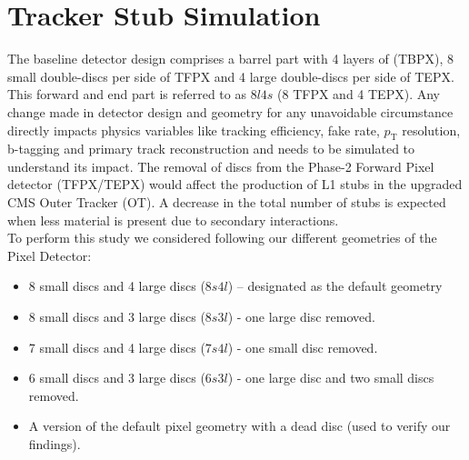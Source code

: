 \section{Tracker Stub Simulation}

The baseline detector design comprises a barrel part with 4 layers of  (TBPX), 8 small double-discs per side of TFPX and 4 large double-discs per side of TEPX. This forward and end part is referred to as $8l4s$ (8 TFPX and 4 TEPX). Any change made in detector design and geometry for any unavoidable circumstance directly impacts physics variables like tracking efficiency, fake rate, $p_\text{T}$ resolution, b-tagging and primary track reconstruction and needs to be simulated to understand its impact. The removal of discs from the Phase-2 Forward Pixel detector (TFPX/TEPX) would affect the production of L1 stubs in the upgraded CMS Outer Tracker (OT). A decrease in the total number of stubs is expected when less material is present due to secondary interactions.\\

To perform this study we considered following our different geometries of the Pixel Detector:

\begin{itemize}
\item{8 small discs and 4 large discs ($8s4l$) -- designated as the default geometry}
\item{8 small discs and 3 large discs ($8s3l$) - one large disc removed.}
\item{7 small discs and 4 large discs ($7s4l$) -  one small disc removed.}
\item{6 small discs and 3 large discs ($6s3l$) - one large disc and two small discs removed.}
\item{A version of the default pixel geometry with a dead disc (used to verify our findings).}
\end{itemize}

\vspace{1em}

